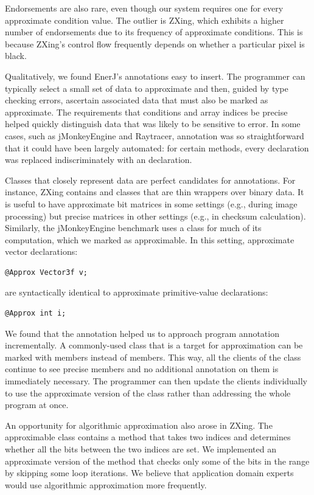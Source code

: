 Endorsements are also rare, even though our system requires one for every
approximate condition value. The outlier is ZXing, which exhibits a higher
number of endorsements due to its frequency of approximate conditions. This is
because ZXing's control flow
frequently depends on whether a particular pixel is black.

Qualitatively, we found EnerJ's annotations easy to insert. The programmer
can typically select a small set of data to approximate and then, guided by type
checking errors, ascertain associated data that must also be marked as
approximate. The requirements that conditions and array indices be precise
helped quickly distinguish data that was likely to be sensitive to error. In
some cases, such as jMonkeyEngine and Raytracer, annotation was so
straightforward that it could have been largely automated: for certain methods,
every  declaration was replaced indiscriminately with an
 declaration.

Classes that closely represent data are perfect candidates for
 annotations. For instance, ZXing contains
 and  classes that are thin wrappers over
binary data. It is useful to have approximate bit matrices in some settings (e.g.,
during image processing) but precise matrices in other settings (e.g., in
checksum calculation). Similarly, the jMonkeyEngine benchmark uses a
 class for much of its computation, which we marked
as approximable.
In this setting, approximate vector declarations:
%
\begin{lstlisting}
@Approx Vector3f v;
\end{lstlisting}
%
are syntactically identical to
approximate primitive-value declarations:
%
\begin{lstlisting}
@Approx int i;
\end{lstlisting}

We found that the  annotation helped us to approach program
annotation incrementally. A commonly-used class that is a target for
approximation can be marked with  members instead of
 members. This way, all the clients of the class continue to
see precise members and no additional annotation on them is immediately
necessary. The programmer can then update the clients individually to use the
approximate version of the class rather than addressing the whole program at
once.

An opportunity for algorithmic approximation also arose in ZXing. The approximable class
 contains a method  that
takes two indices and determines whether all the bits between the
two indices are set. We implemented an approximate version of the method that
checks only some of the bits in the range by skipping some loop iterations.
We believe that application domain experts would use algorithmic
approximation more frequently.

